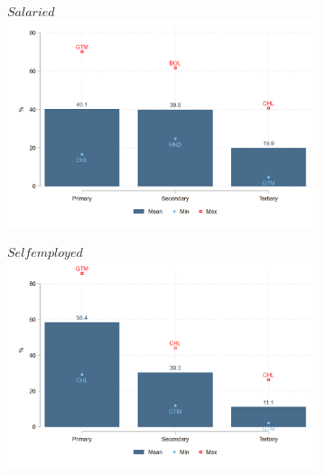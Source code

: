 \documentclass[english]{article}
\begin{document}
\begin{enumerate}
\begin{figure}[h!tbp]
\centering
  \caption{Structure of salaried and self-employed workers}
    \begin{subfigure}{.5\textwidth}
  \centering
    \footnotesize{$Salaried$}
  \includegraphics[width=1\textwidth]{latex/figures/Snapshot/Salaried-education.png}
  \label{fig:salariededuc}
\end{subfigure}%
\begin{subfigure}{.5\textwidth}
  \centering
    \footnotesize{$Self employed$}
  \includegraphics[width=1\textwidth]{latex/figures/Snapshot/Self employed-education.png}
  \label{fig:selfeduc}
\end{subfigure}


\end{figure}
\end{enumerate}
\end{document}
